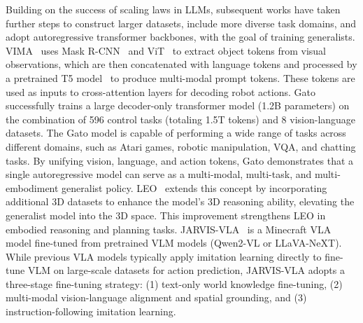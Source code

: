 \documentclass[10pt, a4paper, logo, copyright]{googledeepmind} %
\begin{document}
Building on the success of scaling laws in LLMs, subsequent works have taken further steps to construct larger datasets, include more diverse task domains, and adopt autoregressive transformer backbones, with the goal of training generalists. VIMA~\cite{jiang2022vima} uses Mask R-CNN~\cite{he2017mask} and ViT~\cite{dosovitskiy2020image} to extract object tokens from visual observations, which are then concatenated with language tokens and processed by a pretrained T5 model~\cite{raffel2020exploring} to produce multi-modal prompt tokens. These tokens are used as inputs to cross-attention layers for decoding robot actions.
Gato~\cite{Gato} successfully trains a large decoder-only transformer model (1.2B parameters) on the combination of 596 control tasks (totaling 1.5T tokens) and 8 vision-language datasets. The Gato model is capable of performing a wide range of tasks across different domains, such as Atari games, robotic manipulation, VQA, and chatting tasks. By unifying vision, language, and action tokens, Gato demonstrates that a single autoregressive model can serve as a multi-modal, multi-task, and multi-embodiment generalist policy. LEO~\cite{huang2023embodied} extends this concept by incorporating additional 3D datasets to enhance the model's 3D reasoning ability, elevating the generalist model into the 3D space. This improvement strengthens LEO in embodied reasoning and planning tasks. JARVIS-VLA~\cite{JARVIS-VLA} is a Minecraft VLA model fine-tuned from pretrained VLM models (Qwen2-VL or LLaVA-NeXT). While previous VLA models typically apply imitation learning directly to fine-tune VLM on large-scale datasets for action prediction, JARVIS-VLA adopts a three-stage fine-tuning strategy: (1) text-only world knowledge fine-tuning, (2) multi-modal vision-language alignment and spatial grounding, and (3) instruction-following imitation learning.
\end{document}
